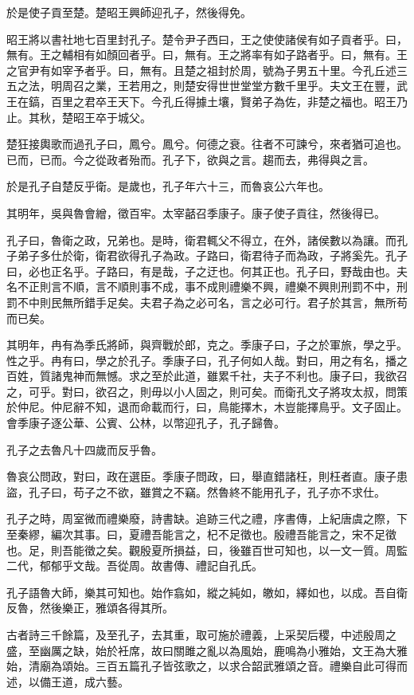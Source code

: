 於是使子貢至楚。楚昭王興師迎孔子，然後得免。

昭王將以書社地七百里封孔子。楚令尹子西曰，王之使使諸侯有如子貢者乎。曰，無有。王之輔相有如顏回者乎。曰，無有。王之將率有如子路者乎。曰，無有。王之官尹有如宰予者乎。曰，無有。且楚之祖封於周，號為子男五十里。今孔丘述三五之法，明周召之業，王若用之，則楚安得世世堂堂方數千里乎。夫文王在豐，武王在鎬，百里之君卒王天下。今孔丘得據土壤，賢弟子為佐，非楚之福也。昭王乃止。其秋，楚昭王卒于城父。

楚狂接輿歌而過孔子曰，鳳兮。鳳兮。何德之衰。往者不可諫兮，來者猶可追也。已而，已而。今之從政者殆而。孔子下，欲與之言。趨而去，弗得與之言。

於是孔子自楚反乎衛。是歲也，孔子年六十三，而魯哀公六年也。

其明年，吳與魯會繒，徵百牢。太宰嚭召季康子。康子使子貢往，然後得已。

孔子曰，魯衛之政，兄弟也。是時，衛君輒父不得立，在外，諸侯數以為讓。而孔子弟子多仕於衛，衛君欲得孔子為政。子路曰，衛君待子而為政，子將奚先。孔子曰，必也正名乎。子路曰，有是哉，子之迂也。何其正也。孔子曰，野哉由也。夫名不正則言不順，言不順則事不成，事不成則禮樂不興，禮樂不興則刑罰不中，刑罰不中則民無所錯手足矣。夫君子為之必可名，言之必可行。君子於其言，無所苟而已矣。

其明年，冉有為季氏將師，與齊戰於郎，克之。季康子曰，子之於軍旅，學之乎。性之乎。冉有曰，學之於孔子。季康子曰，孔子何如人哉。對曰，用之有名，播之百姓，質諸鬼神而無憾。求之至於此道，雖累千社，夫子不利也。康子曰，我欲召之，可乎。對曰，欲召之，則毋以小人固之，則可矣。而衛孔文子將攻太叔，問策於仲尼。仲尼辭不知，退而命載而行，曰，鳥能擇木，木豈能擇鳥乎。文子固止。會季康子逐公華、公賓、公林，以幣迎孔子，孔子歸魯。

孔子之去魯凡十四歲而反乎魯。

魯哀公問政，對曰，政在選臣。季康子問政，曰，舉直錯諸枉，則枉者直。康子患盜，孔子曰，苟子之不欲，雖賞之不竊。然魯終不能用孔子，孔子亦不求仕。

孔子之時，周室微而禮樂廢，詩書缺。追跡三代之禮，序書傳，上紀唐虞之際，下至秦繆，編次其事。曰，夏禮吾能言之，杞不足徵也。殷禮吾能言之，宋不足徵也。足，則吾能徵之矣。觀殷夏所損益，曰，後雖百世可知也，以一文一質。周監二代，郁郁乎文哉。吾從周。故書傳、禮記自孔氏。

孔子語魯大師，樂其可知也。始作翕如，縱之純如，皦如，繹如也，以成。吾自衛反魯，然後樂正，雅頌各得其所。

古者詩三千餘篇，及至孔子，去其重，取可施於禮義，上采契后稷，中述殷周之盛，至幽厲之缺，始於衽席，故曰關雎之亂以為風始，鹿鳴為小雅始，文王為大雅始，清廟為頌始。三百五篇孔子皆弦歌之，以求合韶武雅頌之音。禮樂自此可得而述，以備王道，成六藝。

